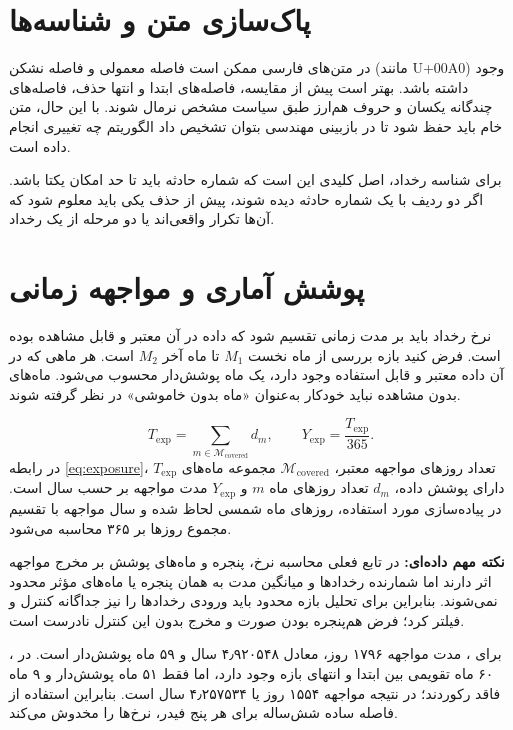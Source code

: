 \documentclass[11pt,a4paper,oneside]{book}
\newcommand{\file}[1]{\lr{\texttt{#1}}}
\newcommand{\code}[1]{\lr{\texttt{#1}}}
\newcommand{\warn}{\noindent\textbf{نکته مهم داده‌ای:} }
\begin{document}
\section{پاک‌سازی متن و شناسه‌ها}
در متن‌های فارسی ممکن است فاصله معمولی و فاصله نشکن (مانند U+00A0) وجود داشته باشد. بهتر است پیش از مقایسه، فاصله‌های ابتدا و انتها حذف، فاصله‌های چندگانه یکسان و حروف هم‌ارز طبق سیاست مشخص نرمال شوند. با این حال، متن خام باید حفظ شود تا در بازبینی مهندسی بتوان تشخیص داد الگوریتم چه تغییری انجام داده است.

برای شناسه رخداد، اصل کلیدی این است که شماره حادثه \code{شماره حادثه} باید تا حد امکان یکتا باشد. اگر دو ردیف با یک شماره حادثه دیده شوند، پیش از حذف یکی باید معلوم شود که آن‌ها تکرار واقعی‌اند یا دو مرحله از یک رخداد.

\section{پوشش آماری و مواجهه زمانی}
نرخ رخداد باید بر مدت زمانی تقسیم شود که داده در آن معتبر و قابل مشاهده بوده است. فرض کنید بازه بررسی از ماه نخست $M_1$ تا ماه آخر $M_2$ است. هر ماهی که در آن داده معتبر و قابل استفاده وجود دارد، یک ماه پوشش‌دار محسوب می‌شود. ماه‌های بدون مشاهده نباید خودکار به‌عنوان «ماه بدون خاموشی» در نظر گرفته شوند.

\begin{equation}
 T_{\mathrm{exp}}=\sum_{m\in\mathcal{M}_{\mathrm{covered}}} d_m,
 \qquad
 Y_{\mathrm{exp}}=\frac{T_{\mathrm{exp}}}{365}.
 \label{eq:exposure}
\end{equation}
در رابطه \eqref{eq:exposure}، $T_{\mathrm{exp}}$ تعداد روزهای مواجهه معتبر، $\mathcal{M}_{\mathrm{covered}}$ مجموعه ماه‌های دارای پوشش داده، $d_m$ تعداد روزهای ماه $m$ و $Y_{\mathrm{exp}}$ مدت مواجهه بر حسب سال است. در پیاده‌سازی مورد استفاده، روزهای ماه شمسی لحاظ شده و سال مواجهه با تقسیم مجموع روزها بر ۳۶۵ محاسبه می‌شود.

\warn در تابع فعلی محاسبه نرخ، پنجره و ماه‌های پوشش بر مخرج مواجهه اثر دارند اما شمارنده رخدادها و میانگین مدت به همان پنجره یا ماه‌های مؤثر محدود نمی‌شوند. بنابراین برای تحلیل بازه محدود باید ورودی رخدادها را نیز جداگانه کنترل و فیلتر کرد؛ فرض هم‌پنجره بودن صورت و مخرج بدون این کنترل نادرست است.

برای \file{5.xlsx}، مدت مواجهه ۱۷۹۶ روز، معادل ۴٫۹۲۰۵۴۸ سال و ۵۹ ماه پوشش‌دار است. در \file{3.xlsx}، ۶۰ ماه تقویمی بین ابتدا و انتهای بازه وجود دارد، اما فقط ۵۱ ماه پوشش‌دار و ۹ ماه فاقد رکوردند؛ در نتیجه مواجهه ۱۵۵۴ روز یا ۴٫۲۵۷۵۳۴ سال است. بنابراین استفاده از فاصله ساده شش‌ساله برای هر پنج فیدر، نرخ‌ها را مخدوش می‌کند.
\end{document}

